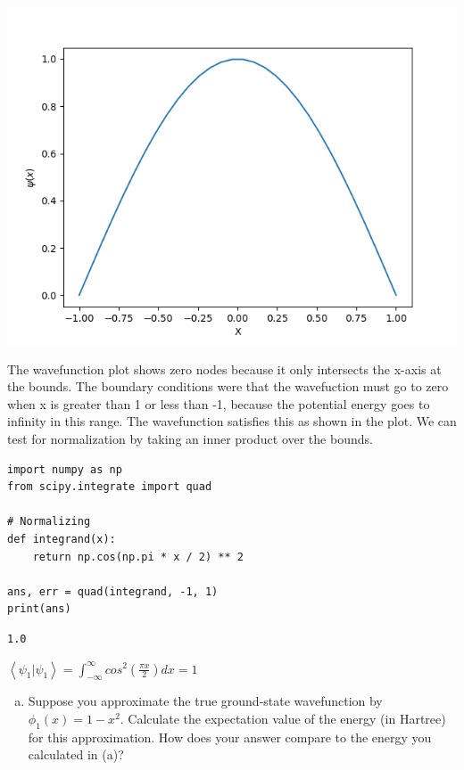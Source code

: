 \documentclass[11pt]{article}
\begin{document}
\begin{center}
\includegraphics[width=.9\linewidth]{./fig1.png}
\end{center}

The wavefunction plot shows zero nodes because it only intersects the x-axis at the bounds. The boundary conditions were that the wavefuction must go to zero when x is greater than 1 or less than -1, because the potential energy goes to infinity in this range. The wavefunction satisfies this as shown in the plot. We can test for normalization by taking an inner product over the bounds. 

\begin{verbatim}
import numpy as np
from scipy.integrate import quad

# Normalizing
def integrand(x):
    return np.cos(np.pi * x / 2) ** 2

ans, err = quad(integrand, -1, 1)
print(ans)
\end{verbatim}

\begin{verbatim}
1.0
\end{verbatim}

\begin{center}

$\left \langle \psi_{1} | \psi_{1} \right \rangle = 
\int_{-\infty}^{\infty} cos^{2}(\frac{\pi x}{2}) dx = 1
$
\end{center}

\begin{enumerate}[(c)]
\item Suppose you approximate the true ground-state wavefunction by \(\phi_{1}(x) = 1 - x^{2}\). Calculate the expectation value of the energy (in Hartree) for this approximation. How does your answer compare to the energy you calculated in (a)?
\end{enumerate}
\end{document}
